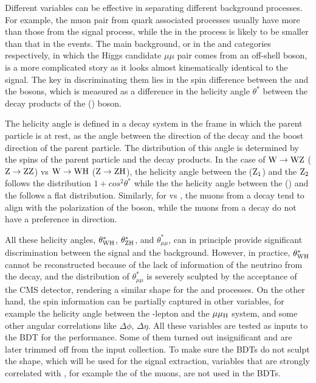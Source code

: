 Different variables can be effective in separating different background processes.
For example, the muon pair from \Pqt quark associated processes usually have more \pt than those from the \WH signal process,
while the \MET in the \DY process is likely to be smaller than that in the \WH events.
The main background, \WZ or \ZZ in the \WH and \ZH categories respectively, 
in which the Higgs candidate $\mu\mu$ pair comes from an off-shell \PZ boson,
is a more complicated story as it looks almost kinematically identical to the signal.  
The key in discriminating them lies in the spin difference between the \PZ and the \PH bosons,
which is measured as a difference in the helicity angle $\theta^{*}$ between the decay products of the \PZ (\PH) boson.

The helicity angle is defined in a decay system in the frame in which the parent particle is at rest,
as the angle between the direction of the decay and the boost direction of the parent particle.
The distribution of this angle is determined by the spins of the parent particle and the decay products.
In the case of $\mathrm{W} \to \mathrm{W}\mathrm{Z}$ ($\mathrm{Z} \to \mathrm{Z}\mathrm{Z}$) vs $\mathrm{W} \to \mathrm{W}\mathrm{H}$ ($\mathrm{Z} \to \mathrm{Z}\mathrm{H}$), the helicity angle between the \PW ($\mathrm{Z}_{1}$) and the $\mathrm{Z}_{2}$ follows the distribution $1 + cos^{2}\theta^{*}$ %
while the the helicity angle between the \PW (\PZ) and the \PH follows a flat distribution.
Similarly, for \zmm vs \hmm, the muons from a \PZ decay tend to align with the polarization of the \PZ boson, 
while the muons from a \PH decay do not have a preference in direction.

All these helicity angles, $\theta^{*}_{\mathrm{W}\mathrm{H}}$, $\theta^{*}_{\mathrm{Z}\mathrm{H}}$, and $\theta^{*}_{\mu\mu}$, 
can in principle provide significant discrimination between the signal and the background.
However, in practice, $\theta^{*}_{\mathrm{W}\mathrm{H}}$ cannot be reconstructed because of the lack of information of the neutrino from the \PW decay, 
and the distribution of $\theta^{*}_{\mu\mu}$ is severely sculpted by the acceptance of the CMS detector, 
rendering a similar shape for the \zmm and \hmm processes.
On the other hand, the spin information can be partially captured in other variables, 
for example the helicity angle between the \PW-lepton and the $\mu\mu_{\mathrm{H}}$ system, 
and some other angular correlations like $\Delta\phi$, $\Delta\eta$.
All these variables are tested as inputs to the BDT for the performance.
Some of them turned out insignificant and are later trimmed off from the input collection.
To make sure the BDTs do not sculpt the \mmm shape, which will be used for the signal extraction,
variables that are strongly correlated with \mmm, for example the \pt of the muons, are not used in the BDTs.  


